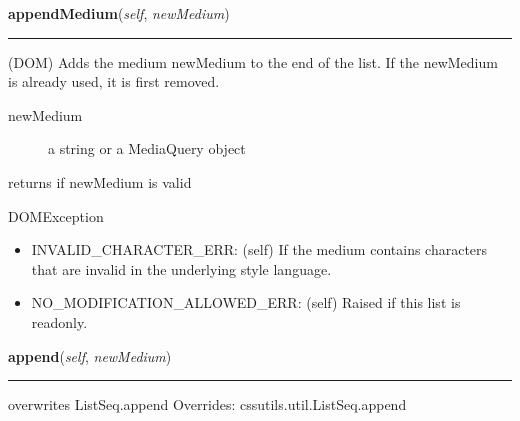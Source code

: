     \label{cssutils:stylesheets:medialist:MediaList:appendMedium}

    \vspace{0.5ex}

\hspace{.8\funcindent}\begin{boxedminipage}{\funcwidth}

    \raggedright \textbf{appendMedium}(\textit{self}, \textit{newMedium})

    \vspace{-1.5ex}

    \rule{\textwidth}{0.5\fboxrule}
\setlength{\parskip}{2ex}

(DOM)
Adds the medium newMedium to the end of the list. If the newMedium
is already used, it is first removed.
\begin{description}
\item[{newMedium}] \leavevmode 
a string or a MediaQuery object

\end{description}

returns if newMedium is valid

DOMException
\begin{itemize}
\item {} 
INVALID{\_}CHARACTER{\_}ERR: (self)
If the medium contains characters that are invalid in the
underlying style language.

\item {} 
NO{\_}MODIFICATION{\_}ALLOWED{\_}ERR: (self)
Raised if this list is readonly.

\end{itemize}
\setlength{\parskip}{1ex}
    \end{boxedminipage}

    \vspace{0.5ex}

\hspace{.8\funcindent}\begin{boxedminipage}{\funcwidth}

    \raggedright \textbf{append}(\textit{self}, \textit{newMedium})

    \vspace{-1.5ex}

    \rule{\textwidth}{0.5\fboxrule}
\setlength{\parskip}{2ex}

overwrites ListSeq.append
\setlength{\parskip}{1ex}
      Overrides: cssutils.util.ListSeq.append

    \end{boxedminipage}

